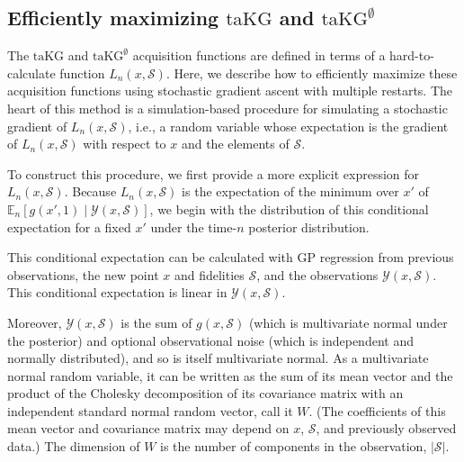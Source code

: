 \documentclass[letterpaper]{article}
\newcommand{\E}{\mathbb{E}}
\newcommand{\taKG}{\text{taKG}}
\newcommand{\taKGE}{\text{taKG}^\emptyset}
\numberwithin{equation}{section}
\renewcommand{\S}{\mathcal{S}}
\newcommand{\Y}{\mathcal{Y}}
\newcommand{\loss}{L}
\begin{document}

\subsection{Efficiently maximizing $\taKG$ and $\taKGE$}
\label{sect:optimize}


The $\taKG$ and $\taKGE$ acquisition functions are defined in terms of a hard-to-calculate function $\loss_n(x,\S)$. 
Here, we describe how to efficiently maximize these acquisition functions using stochastic gradient ascent with multiple restarts.  The heart of this method is a simulation-based procedure for simulating a stochastic gradient of $\loss_n(x,\S)$, i.e., a random variable whose expectation is the gradient of $\loss_n(x,\S)$ with respect to $x$ and the elements of $\S$.

To construct this procedure, we first provide a more explicit expression for $\loss_n(x,\S)$.
Because $\loss_n(x,\S)$ is the expectation of the minimum over $x'$ of $\E_n\left[g(x',1) \mid \Y(x,\S)\right]$, 
we begin with the distribution of this conditional expectation for a fixed $x'$ under the time-$n$ posterior distribution.

This conditional expectation can be calculated with GP regression from previous observations, the new point $x$ and fidelities $\S$, and the observations $\Y(x,\S)$.  This conditional expectation is linear in $\Y(x,\S)$.

Moreover, $\Y(x,\S)$ is the sum of $g(x,\S)$ (which is multivariate normal under the posterior) and optional observational noise (which is independent and normally distributed), and so is itself multivariate normal.
As a multivariate normal random variable, it can be written as the sum of its mean vector and the product of the Cholesky decomposition of its covariance matrix with an independent standard normal random vector, call it $W$.  (The coefficients of this mean vector and covariance matrix may depend on $x$, $\S$, and previously observed data.)  The dimension of $W$ is the number of components in the observation, $|\S|$.
\end{document}

